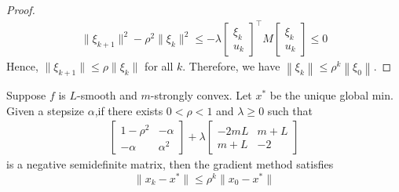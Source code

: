 \documentclass[11pt]{elegantbook}
\begin{document}
\begin{proof}
\begin{equation}
    \begin{aligned}
        \|\xi_{k+1}\|^2-\rho^2\|\xi_k\|^2\leq -\lambda\left[\begin{array}{l}
            \xi_{k} \\
            u_{k}
        \end{array}\right]^{\top}
        M
            \left[\begin{array}{l}
                \xi_{k} \\
                u_{k}
            \end{array}\right]\leq 0
    \end{aligned}
    \nonumber
\end{equation}
Hence, $\|\xi_{k+1}\|\leq \rho\|\xi_k\|$ for all $k$. Therefore, we have $\left\|\xi_{k}\right\| \leq \rho^{k}\left\|\xi_{0}\right\|$.
\end{proof}


\begin{theorem}
    Suppose $f$ is $L$-smooth and $m$-strongly convex. Let $x^*$ be the unique global
    min. Given a stepsize $\alpha$,if there exists $0<\rho<1$ and $\lambda\geq 0$ such that
    \begin{equation}
        \begin{aligned}
            \begin{bmatrix}
                1-\rho^2&	-\alpha\\
                -\alpha&	\alpha^2
            \end{bmatrix}+\lambda \begin{bmatrix}
                -2mL&	m+L\\
                m+L&	-2
            \end{bmatrix}
        \end{aligned}
        \nonumber
    \end{equation}
    is a negative semidefinite matrix, then the gradient method satisfies $$\|x_k-x^*\|\leq \rho^k\|x_0-x^*\|$$
\end{theorem}
\end{document}
